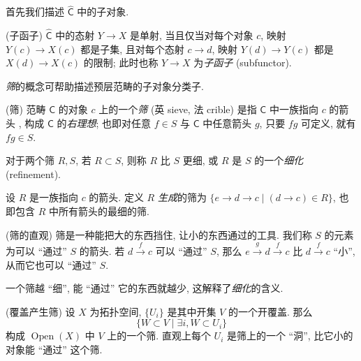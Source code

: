     首先我们描述 $\widehat{\mathsf C}$ 中的子对象.

\begin{propdef}
    [label={subfunctor-description}]
    {(子函子)}
    $\widehat{\mathsf C}$ 中的态射 $Y \to X$ 是单射, 当且仅当对每个对象 $c$, 映射 $Y(c) \to X(c)$ 都是子集,
    且对每个态射 $c\to d$, 映射 $Y(d) \to Y(c)$ 都是 $X(d) \to X(c)$ 的限制; 此时也称 $Y \to X$ 为\emph{子函子} (subfunctor).
\end{propdef}

\emph{筛}的概念可帮助描述预层范畴的子对象分类子.

\begin{definition}
	[label={sieve}]
    {(筛)}
    范畴 $\mathsf C$ 的对象 $c$ 上的一个\emph{筛} (英 sieve, 法 crible) 是指 $\mathsf C$ 中一族指向 $c$ 的箭头 , 构成 $\mathsf C$ 的\emph{右理想}; 也即对任意 $f\in S$ 与 $\mathsf C$ 中任意箭头 $g$, 只要 $fg$ 可定义, 就有 $fg \in S$.

    对于两个筛 $R,S$, 若 $R\subset S$, 则称 $R$ 比 $S$ 更细, 或 $R$ 是 $S$ 的一个\emph{细化} (refinement).

    设 $R$ 是一族指向 $c$ 的箭头. 定义 $R$ \emph{生成}的筛为  $\{e\to d\to c\mid (d\to c)\in R \}$, 也即包含 $R$ 中所有箭头的最细的筛.
\end{definition}

\begin{remark}
    {(筛的直观)}
    筛是一种能把大的东西挡住, 让小的东西通过的工具. 我们称 $S$ 的元素为可以 ``通过'' $S$ 的箭头.
    若 $d \overset{f}{\longrightarrow} c$ 可以 ``通过'' $S$, 那么 $e \overset{g}{\longrightarrow} d \overset{f}{\longrightarrow} c$ 比 $d \overset{f}{\longrightarrow} c$ ``小'', 从而它也可以 ``通过'' $S$.

    \begin{center}
        
    \end{center}


    一个筛越 ``细'', 能 ``通过'' 它的东西就越少, 这解释了\emph{细化}的含义.
\end{remark}

\begin{example}
	[label={sieve-from-cover}]
	{(覆盖产生筛)}
	设 $X$ 为拓扑空间, $\{U_i\}$ 是其中开集 $V$ 的一个开覆盖. 那么
	$$
	\big\{W\subset V \mid \exists i, W \subset U_i\big\}
	$$
	构成 $\operatorname{Open}(X)$ 中 $V$ 上的一个筛. 直观上每个 $U_i$ 是筛上的一个 ``洞'', 比它小的对象能 ``通过'' 这个筛.
\end{example}

